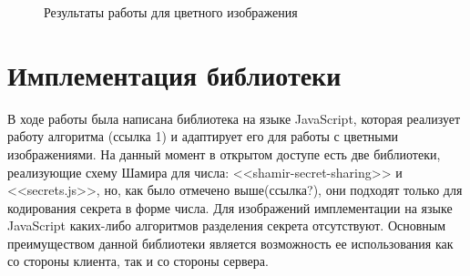 \documentclass[a4paper,article,14pt]{extarticle}
\begin{document}
\begin{figure}[ph!]
\begin{minipage}[h]{0.3\linewidth}
    \end{minipage}
    \hfill
    \begin{minipage}[h]{0.3\linewidth}
    \end{minipage}
    \caption{Результаты работы для цветного изображения}
    \label{fig:experimental_mod}
\end{figure}

\newpage
\section{Имплементация библиотеки}

В ходе работы была написана библиотека на языке JavaScript, которая реализует работу алгоритма (ссылка 1) и адаптирует его для
работы с цветными изображениями. 
На данный момент в открытом доступе есть две библиотеки, реализующие схему Шамира для числа: <<shamir-secret-sharing>> и <<secrets.js>>,
но, как было отмечено выше(ссылка?), они подходят только для кодирования секрета в форме числа. Для изображений
имплементации на языке JavaScript каких-либо алгоритмов разделения секрета отсутствуют.
Основным преимуществом данной библиотеки является возможность ее использования как со стороны клиента, так и со стороны сервера.
\end{document}
